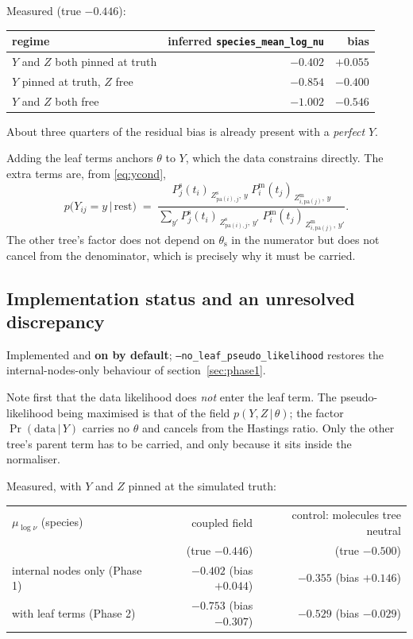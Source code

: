 \documentclass[11pt,a4paper]{article}
\newcommand{\Ys}{Y}
\newcommand{\Zs}{Z^{\mathrm{s}}}
\newcommand{\Zm}{Z^{\mathrm{m}}}
\newcommand{\pa}{\mathrm{pa}}
\newcommand{\given}{\,\vert\,}
\begin{document}
Measured (true $-0.446$):
\begin{center}
\begin{tabular}{lrr}
\toprule
regime & inferred \texttt{species\_mean\_log\_nu} & bias\\
\midrule
$\Ys$ and $Z$ both pinned at truth & $-0.402$ & $+0.055$\\
$\Ys$ pinned at truth, $Z$ free    & $-0.854$ & $-0.400$\\
$\Ys$ and $Z$ both free            & $-1.002$ & $-0.546$\\
\bottomrule
\end{tabular}
\end{center}
About three quarters of the residual bias is already present with a \emph{perfect} $\Ys$.

Adding the leaf terms anchors $\theta$ to $\Ys$, which the data constrains directly. The
extra terms are, from \eqref{eq:ycond},
\[
  p\bigl(\Ys_{ij} = y \given \text{rest}\bigr)
  \;=\;
  \frac{P^{\mathrm{s}}_{j}(t_i)_{\,\Zs_{\pa(i),j},\,y}\;
        P^{\mathrm{m}}_{i}(t_j)_{\,\Zm_{i,\pa(j)},\,y}}
       {\sum_{y'} P^{\mathrm{s}}_{j}(t_i)_{\,\Zs_{\pa(i),j},\,y'}\;
        P^{\mathrm{m}}_{i}(t_j)_{\,\Zm_{i,\pa(j)},\,y'}} .
\]
The other tree's factor does not depend on $\theta_{\mathrm{s}}$ in the numerator but does
not cancel from the denominator, which is precisely why it must be carried.

\subsection{Implementation status and an unresolved discrepancy}
\label{sec:phase2status}

Implemented and \textbf{on by default}; \texttt{--no\_leaf\_pseudo\_likelihood} restores the
internal-nodes-only behaviour of section~\ref{sec:phase1}.

Note first that the data likelihood does \emph{not} enter the leaf term. The pseudo-likelihood
being maximised is that of the field $p(\Ys, Z \given \theta)$; the factor
$\Pr(\text{data}\given \Ys)$ carries no $\theta$ and cancels from the Hastings ratio. Only the
other tree's parent term has to be carried, and only because it sits inside the normaliser.

Measured, with $\Ys$ and $Z$ pinned at the simulated truth:
\begin{center}
\begin{tabular}{lrr}
\toprule
$\mu_{\log\nu}$ (species) & coupled field & control: molecules tree neutral\\
                          & (true $-0.446$) & (true $-0.500$)\\
\midrule
internal nodes only (Phase 1) & $-0.402$ (bias $+0.044$) & $-0.355$ (bias $+0.146$)\\
with leaf terms (Phase 2)     & $-0.753$ (bias $-0.307$) & $-0.529$ (bias $-0.029$)\\
\bottomrule
\end{tabular}
\end{center}
\end{document}
